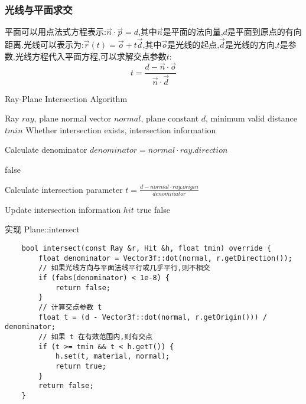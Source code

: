 \documentclass[a4paper,twoside]{article}
\begin{document}
\subsubsection{光线与平面求交}
平面可以用点法式方程表示:$\vec{n} \cdot \vec{p} = d$,其中$\vec{n}$是平面的法向量,$d$是平面到原点的有向距离.光线可以表示为:$\vec{r}(t) = \vec{o} + t\vec{d}$,其中$\vec{o}$是光线的起点,$\vec{d}$是光线的方向,$t$是参数.光线方程代入平面方程,可以求解交点参数$t$:
\begin{equation}
    t = \frac{d - \vec{n} \cdot \vec{o}}{\vec{n} \cdot \vec{d}}
\end{equation}
\begin{algorithm}[H]
    \caption{Ray-Plane Intersection Algorithm}
    \label{alg:ray_plane}
    \begin{algorithmic}[1]
        \REQUIRE Ray $ray$, plane normal vector $normal$, plane constant $d$, minimum valid distance $tmin$
        \ENSURE Whether intersection exists, intersection information
        
        \STATE Calculate denominator $denominator = normal \cdot ray.direction$
        
            \RETURN false 
        \ENDIF
        
        \STATE Calculate intersection parameter $t = \frac{d - normal \cdot ray.origin}{denominator}$
        
            \STATE Update intersection information $hit$
            \RETURN true
        \ELSE
            \RETURN false
        \ENDIF
    \end{algorithmic}
\end{algorithm}
\begin{listing}[H]
    \caption{实现 Plane::intersect}
    \label{code:plane_intersect}
    \begin{verbatim}
    bool intersect(const Ray &r, Hit &h, float tmin) override {
        float denominator = Vector3f::dot(normal, r.getDirection());
        // 如果光线方向与平面法线平行或几乎平行,则不相交
        if (fabs(denominator) < 1e-8) {
            return false;
        }    
        // 计算交点参数 t
        float t = (d - Vector3f::dot(normal, r.getOrigin())) / denominator;
        // 如果 t 在有效范围内,则有交点
        if (t >= tmin && t < h.getT()) {
            h.set(t, material, normal);
            return true;
        }
        return false;
    }
    \end{verbatim}
\end{listing}
\end{document}
